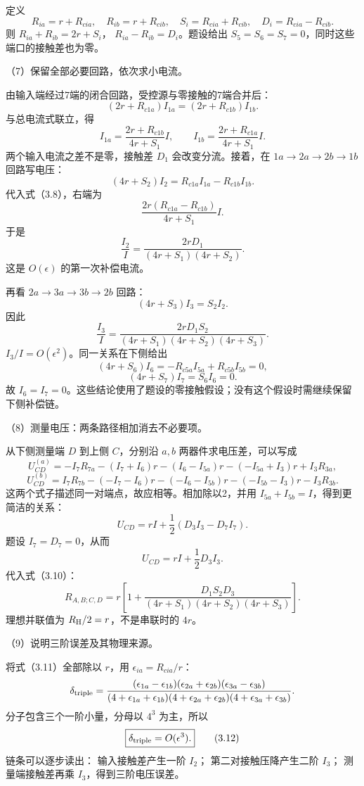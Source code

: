\documentclass[12pt,a4paper,fontset=fandol]{ctexart}
\begin{document}
定义 \[
R_{ia}=r+R_{cia},\quad R_{ib}=r+R_{cib},\quad
S_i=R_{cia}+R_{cib},\quad D_i=R_{cia}-R_{cib}.
\] 则 \(R_{ia}+R_{ib}=2r+S_i\)， \(R_{ia}-R_{ib}=D_i\)。题设给出
\(S_5=S_6=S_7=0\)，同时这些端口的接触差也为零。

（7）保留全部必要回路，依次求小电流。

由输入端经过7端的闭合回路，受控源与零接触的7端合并后： \[
(2r+R_{c1a})I_{1a}
=(2r+R_{c1b})I_{1b}.
\] 与总电流式联立，得 \[
\boxed{
I_{1a}=\frac{2r+R_{c1b}}{4r+S_1}I,\qquad
I_{1b}=\frac{2r+R_{c1a}}{4r+S_1}I.}\tag{3.8}
\] 两个输入电流之差不是零，接触差 \(D_1\) 会改变分流。接着，在
\(1a\to2a\to2b\to1b\) 回路写电压： \[
(4r+S_2)I_2=R_{c1a}I_{1a}-R_{c1b}I_{1b}.
\] 代入式（3.8），右端为 \[
\frac{2r(R_{c1a}-R_{c1b})}{4r+S_1}I.
\] 于是 \[
\boxed{\frac{I_2}{I}
=\frac{2rD_1}{(4r+S_1)(4r+S_2)}.}\tag{3.9}
\] 这是 \(O(\epsilon)\) 的第一次补偿电流。

再看 \(2a\to3a\to3b\to2b\) 回路： \[
(4r+S_3)I_3=S_2I_2.
\] 因此 \[
\boxed{\frac{I_3}{I}
=\frac{2rD_1S_2}
{(4r+S_1)(4r+S_2)(4r+S_3)}.}\tag{3.10}
\] \(I_3/I=O(\epsilon^2)\)。同一关系在下侧给出 \[
(4r+S_6)I_6=-R_{c5a}I_{5a}+R_{c5b}I_{5b}=0,
\] \[
(4r+S_7)I_7=S_6I_6=0.
\] 故
\(I_6=I_7=0\)。这些结论使用了题设的零接触假设；没有这个假设时需继续保留下侧补偿链。

（8）测量电压：两条路径相加消去不必要项。

从下侧测量端 \(D\) 到上侧 \(C\)，分别沿 \(a,b\) 两器件求电压差，可以写成
\[
U_{CD}^{(a)}
=-I_7R_{7a}-(I_7+I_6)r
-(I_6-I_{5a})r-(-I_{5a}+I_3)r+I_3R_{3a},
\] \[
U_{CD}^{(b)}
=I_7R_{7b}-(-I_7-I_6)r
-(-I_6-I_{5b})r-(-I_{5b}-I_3)r-I_3R_{3b}.
\] 这两个式子描述同一对端点，故应相等。相加除以2，并用
\(I_{5a}+I_{5b}=I\)，得到更简洁的关系： \[
U_{CD}=rI+\frac12(D_3I_3-D_7I_7).
\] 题设 \(I_7=D_7=0\)，从而 \[
U_{CD}=rI+\frac12D_3I_3.
\] 代入式（3.10）： \[
\boxed{
R_{A,B;C,D}
=r\left[
1+\frac{D_1S_2D_3}
{(4r+S_1)(4r+S_2)(4r+S_3)}
\right].}\tag{3.11}
\] 理想并联值为 \(R_{\rm H}/2=r\)，不是串联时的 \(4r\)。

（9）说明三阶误差及其物理来源。

将式（3.11）全部除以 \(r\)，用 \(\epsilon_{ia}=R_{cia}/r\)： \[
\delta_{\rm triple}=
\frac{(\epsilon_{1a}-\epsilon_{1b})
(\epsilon_{2a}+\epsilon_{2b})
(\epsilon_{3a}-\epsilon_{3b})}
{(4+\epsilon_{1a}+\epsilon_{1b})
(4+\epsilon_{2a}+\epsilon_{2b})
(4+\epsilon_{3a}+\epsilon_{3b})}.
\] 分子包含三个一阶小量，分母以 \(4^3\) 为主，所以 \[
\boxed{\delta_{\rm triple}=O(\epsilon^3).}\tag{3.12}
\] 链条可以逐步读出： 输入接触差产生一阶 \(I_2\)；
第二对接触压降产生二阶 \(I_3\)； 测量端接触差再乘
\(I_3\)，得到三阶电压误差。
\end{document}
